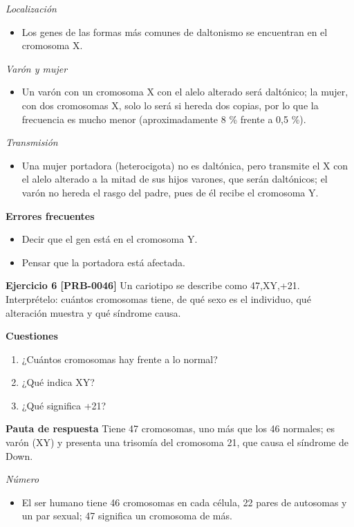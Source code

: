 \documentclass{book}
\begin{document}
\noindent\textit{Localización}
\begin{itemize}
\item Los genes de las formas más comunes de daltonismo se encuentran en el cromosoma X.
\end{itemize}

\noindent\textit{Varón y mujer}
\begin{itemize}
\item Un varón con un cromosoma X con el alelo alterado será daltónico; la mujer, con dos cromosomas X, solo lo será si hereda dos copias, por lo que la frecuencia es mucho menor (aproximadamente 8 \% frente a 0,5 \%).
\end{itemize}

\noindent\textit{Transmisión}
\begin{itemize}
\item Una mujer portadora (heterocigota) no es daltónica, pero transmite el X con el alelo alterado a la mitad de sus hijos varones, que serán daltónicos; el varón no hereda el rasgo del padre, pues de él recibe el cromosoma Y.
\end{itemize}

\noindent\textbf{Errores frecuentes}
\begin{itemize}
\item Decir que el gen está en el cromosoma Y.
\item Pensar que la portadora está afectada.
\end{itemize}

\noindent\textbf{Ejercicio 6 [PRB-0046]}
Un cariotipo se describe como 47,XY,+21. Interprételo: cuántos cromosomas tiene, de qué sexo es el individuo, qué alteración muestra y qué síndrome causa.


\noindent\textbf{Cuestiones}
\begin{enumerate}
\item ¿Cuántos cromosomas hay frente a lo normal?
\item ¿Qué indica XY?
\item ¿Qué significa +21?
\end{enumerate}

\noindent\textbf{Pauta de respuesta}
Tiene 47 cromosomas, uno más que los 46 normales; es varón (XY) y presenta una trisomía del cromosoma 21, que causa el síndrome de Down.


\noindent\textit{Número}
\begin{itemize}
\item El ser humano tiene 46 cromosomas en cada célula, 22 pares de autosomas y un par sexual; 47 significa un cromosoma de más.
\end{itemize}
\end{document}
